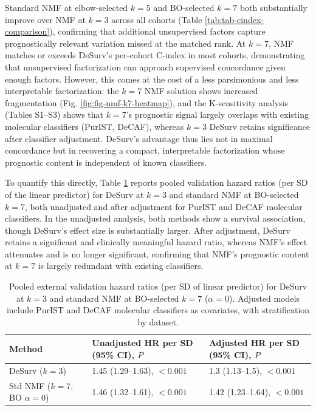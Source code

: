 \documentclass[
]{article}
\begin{document}
Standard NMF at elbow-selected \(k = 5\) and BO-selected \(k = 7\) both
substantially improve over NMF at \(k = 3\) across all cohorts (Table
\ref{tab:tab-cindex-comparison}), confirming that additional
unsupervised factors capture prognostically relevant variation missed at
the matched rank. At \(k = 7\), NMF matches or exceeds DeSurv's
per-cohort C-index in most cohorts, demonstrating that unsupervised
factorization can approach supervised concordance given enough factors.
However, this comes at the cost of a less parsimonious and less
interpretable factorization: the \(k = 7\) NMF solution shows increased
fragmentation (Fig. \ref{fig:fig-nmf-k7-heatmap}), and the K-sensitivity
analysis (Tables S1--S3) shows that \(k = 7\)'s prognostic signal
largely overlaps with existing molecular classifiers (PurIST, DeCAF),
whereas \(k = 3\) DeSurv retains significance after classifier
adjustment. DeSurv's advantage thus lies not in maximal concordance but
in recovering a compact, interpretable factorization whose prognostic
content is independent of known classifiers.

To quantify this directly, Table \ref{tab:tab-hr-adjusted} reports
pooled validation hazard ratios (per SD of the linear predictor) for
DeSurv at \(k = 3\) and standard NMF at BO-selected \(k = 7\), both
unadjusted and after adjustment for PurIST and DeCAF molecular
classifiers. In the unadjusted analysis, both methods show a survival
association, though DeSurv's effect size is substantially larger. After
adjustment, DeSurv retains a significant and clinically meaningful
hazard ratio, whereas NMF's effect attenuates and is no longer
significant, confirming that NMF's prognostic content at \(k = 7\) is
largely redundant with existing classifiers.

\begin{table}[!h]
\centering
\caption{\label{tab:tab-hr-adjusted}Pooled external validation hazard ratios (per SD of linear predictor) for DeSurv at $k = 3$ and standard NMF at BO-selected $k = 7$ ($\alpha = 0$). Adjusted models include PurIST and DeCAF molecular classifiers as covariates, with stratification by dataset. \label{tab:tab-hr-adjusted}}
\centering
\fontsize{9}{11}\selectfont
\begin{tabular}[t]{lll}
\toprule
Method & Unadjusted HR per SD (95\% CI), $P$ & Adjusted HR per SD (95\% CI), $P$\\
\midrule
DeSurv ($k = 3$) & 1.45 (1.29--1.63), $< 0.001$ & 1.3 (1.13--1.5), $< 0.001$\\
Std NMF ($k = 7$, BO $\alpha = 0$) & 1.46 (1.32--1.61), $< 0.001$ & 1.42 (1.23--1.64), $< 0.001$\\
\bottomrule
\end{tabular}
\end{table}
\end{document}
